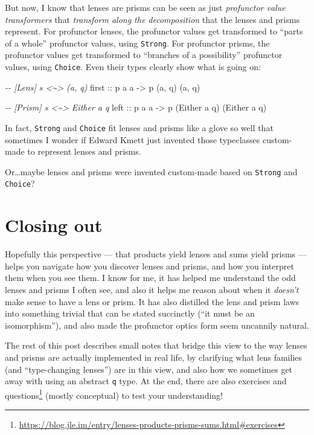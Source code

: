 \documentclass[]{article}
\newenvironment{Shaded}{}{}
\newcommand{\CommentTok}[1]{\textcolor[rgb]{0.38,0.63,0.69}{\textit{#1}}}
\newcommand{\DataTypeTok}[1]{\textcolor[rgb]{0.56,0.13,0.00}{#1}}
\newcommand{\NormalTok}[1]{#1}
\newcommand{\OtherTok}[1]{\textcolor[rgb]{0.00,0.44,0.13}{#1}}
\renewcommand{\href}[2]{#2\footnote{\url{#1}}}
\begin{document}
But now, I know that lenses are prisms can be seen as just \emph{profunctor
value transformers} that \emph{transform along the decomposition} that the
lenses and prisms represent. For profunctor lenses, the profunctor values get
transformed to ``parts of a whole'' profunctor values, using \texttt{Strong}.
For profunctor prisms, the profunctor values get transformed to ``branches of a
possibility'' profunctor values, using \texttt{Choice}. Even their types clearly
show what is going on:

\begin{Shaded}
\begin{Highlighting}[]
\CommentTok{{-}{-} [Lens]  s <\textasciitilde{}> (a, q)}
\OtherTok{first\textquotesingle{} ::}\NormalTok{ p a a }\OtherTok{{-}>}\NormalTok{ p (a, q) (a, q)}

\CommentTok{{-}{-} [Prism] s <\textasciitilde{}> Either a q}
\OtherTok{left\textquotesingle{}  ::}\NormalTok{ p a a }\OtherTok{{-}>}\NormalTok{ p (}\DataTypeTok{Either}\NormalTok{ a q) (}\DataTypeTok{Either}\NormalTok{ a q)}
\end{Highlighting}
\end{Shaded}

In fact, \texttt{Strong} and \texttt{Choice} fit lenses and prisms like a glove
so well that sometimes I wonder if Edward Kmett just invented those typeclasses
custom-made to represent lenses and prisms.

Or\ldots maybe lenses and prisms were invented custom-made based on
\texttt{Strong} and \texttt{Choice}?

\hypertarget{closing-out}{%
\section{Closing out}\label{closing-out}}

Hopefully this perspective --- that products yield lenses and sums yield prisms
--- helps you navigate how you discover lenses and prisms, and how you interpret
them when you see them. I know for me, it has helped me understand the odd
lenses and prisms I often see, and also it helps me reason about when it
\emph{doesn't} make sense to have a lens or prism. It has also distilled the
lens and prism laws into something trivial that can be stated succinctly (``it
must be an isomorphism''), and also made the profunctor optics form seem
uncannily natural.

The rest of this post describes small notes that bridge this view to the way
lenses and prisms are actually implemented in real life, by clarifying what lens
families (and ``type-changing lenses'') are in this view, and also how we
sometimes get away with using an abstract \texttt{q} type. At the end, there are
also
\href{https://blog.jle.im/entry/lenses-products-prisms-sums.html\#exercises}{exercises
and questions} (mostly conceptual) to test your understanding!
\end{document}

